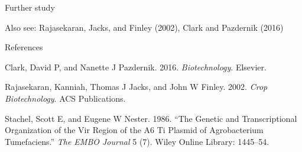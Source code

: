 \documentclass[ignorenonframetext,aspectratio=169]{beamer}
\begin{document}
\begin{frame}{Further study}
\protect\hypertarget{further-study}{}

Also see: Rajasekaran, Jacks, and Finley (2002), Clark and Pazdernik
(2016)

\end{frame}

\begin{frame}{References}
\protect\hypertarget{references}{}

\hypertarget{refs}{}
\leavevmode\hypertarget{ref-clark2016biotechnology}{}%
Clark, David P, and Nanette J Pazdernik. 2016. \emph{Biotechnology}.
Elsevier.

\leavevmode\hypertarget{ref-rajasekaran2002crop}{}%
Rajasekaran, Kanniah, Thomas J Jacks, and John W Finley. 2002.
\emph{Crop Biotechnology}. ACS Publications.

\leavevmode\hypertarget{ref-stachel1986genetic}{}%
Stachel, Scott E, and Eugene W Nester. 1986. ``The Genetic and
Transcriptional Organization of the Vir Region of the A6 Ti Plasmid of
Agrobacterium Tumefaciens.'' \emph{The EMBO Journal} 5 (7). Wiley Online
Library: 1445--54.

\end{frame}
\end{document}
